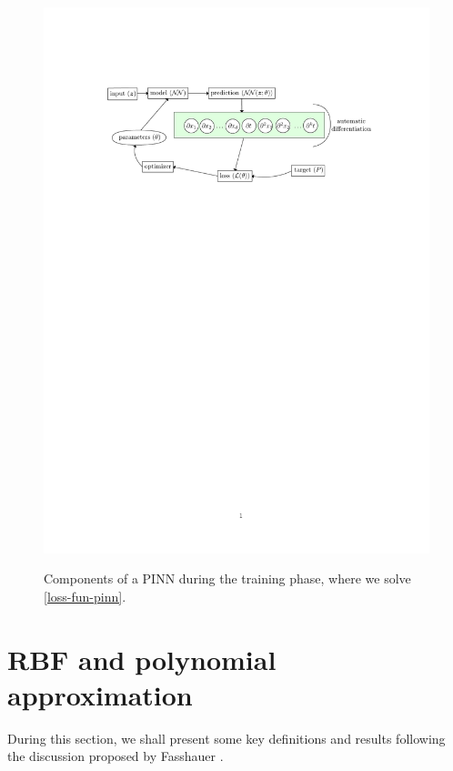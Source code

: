 \documentclass[12pt]{report} %
\begin{document}
\begin{figure}[ht]
  \centering
  {\includegraphics[width=\textwidth, clip=true, trim={3cm 20cm 3cm 4cm}]{imagenes/autodiffgraph.pdf}}
  \caption{Components of a PINN during the training phase, where we solve \eqref{loss-fun-pinn}.
  }\label{fig:autodiffgraph}
\end{figure}

\section{RBF and polynomial approximation}


During this section, we shall present some key definitions and results
following the discussion proposed by Fasshauer \cite{fasshauer2007meshfree}.
\end{document}

